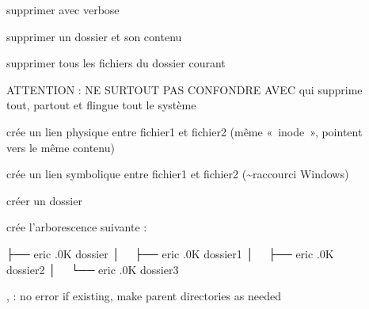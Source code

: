 \documentclass[letterpaper,10pt,french]{sphinxmanual}
\begin{document}
\begin{description}
\item[{}] \leavevmode
supprimer avec verbose

\item[{}] \leavevmode
supprimer un dossier et son contenu

\item[{}] \leavevmode
supprimer tous les fichiers du dossier courant

ATTENTION : NE SURTOUT PAS CONFONDRE AVEC  qui supprime tout, partout et flingue tout le système

\item[{}] \leavevmode
crée un lien physique entre fichier1 et fichier2 (même « inode », pointent vers le même contenu)

\item[{}] \leavevmode
crée un lien symbolique entre fichier1 et fichier2 (\textasciitilde{}raccourci Windows)

\item[{}] \leavevmode
créer un dossier

\item[{}] \leavevmode
crée l’arborescence suivante :

%
\begin{sphinxVerbatim}[commandchars=\\\{\}]
├── \PYG{o}{[}eric     .0K\PYG{o}{]}  dossier
│   ├── \PYG{o}{[}eric     .0K\PYG{o}{]}  dossier1
│   ├── \PYG{o}{[}eric     .0K\PYG{o}{]}  dossier2
│   └── \PYG{o}{[}eric     .0K\PYG{o}{]}  dossier3
\end{sphinxVerbatim}

,  : no error if existing, make parent directories as needed

\end{description}
\end{document}
